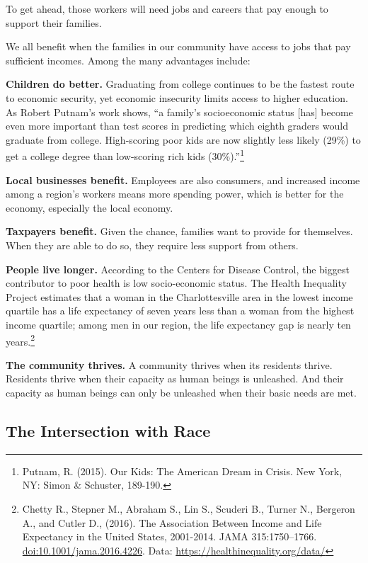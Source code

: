 \documentclass[
]{article}
\begin{document}
To get ahead, those workers will need jobs and careers that pay enough
to support their families.

We all benefit when the families in our community have access to jobs
that pay sufficient incomes. Among the many advantages include:

\textbf{Children do better.} Graduating from college continues to be the
fastest route to economic security, yet economic insecurity limits
access to higher education. As Robert Putnam's work shows, ``a family's
socioeconomic status {[}has{]} become even more important than test
scores in predicting which eighth graders would graduate from college.
High-scoring poor kids are now slightly less likely (29\%) to get a
college degree than low-scoring rich kids (30\%).''\footnote{Putnam, R.
  (2015). Our Kids: The American Dream in Crisis. New York, NY: Simon \&
  Schuster, 189-190.}

\textbf{Local businesses benefit.} Employees are also consumers, and
increased income among a region's workers means more spending power,
which is better for the economy, especially the local economy.

\textbf{Taxpayers benefit.} Given the chance, families want to provide
for themselves. When they are able to do so, they require less support
from others.

\textbf{People live longer.} According to the Centers for Disease
Control, the biggest contributor to poor health is low socio-economic
status. The Health Inequality Project estimates that a woman in the
Charlottesville area in the lowest income quartile has a life expectancy
of seven years less than a woman from the highest income quartile; among
men in our region, the life expectancy gap is nearly ten
years.\footnote{Chetty R., Stepner M., Abraham S., Lin S., Scuderi B.,
  Turner N., Bergeron A., and Cutler D., (2016). The Association Between
  Income and Life Expectancy in the United States, 2001-2014. JAMA
  315:1750--1766. \url{doi:10.1001/jama.2016.4226}. Data:
  \url{https://healthinequality.org/data/}}

\textbf{The community thrives.} A community thrives when its residents
thrive. Residents thrive when their capacity as human beings is
unleashed. And their capacity as human beings can only be unleashed when
their basic needs are met.

\hypertarget{the-intersection-with-race}{%
\subsection{The Intersection with
Race}\label{the-intersection-with-race}}
\end{document}
